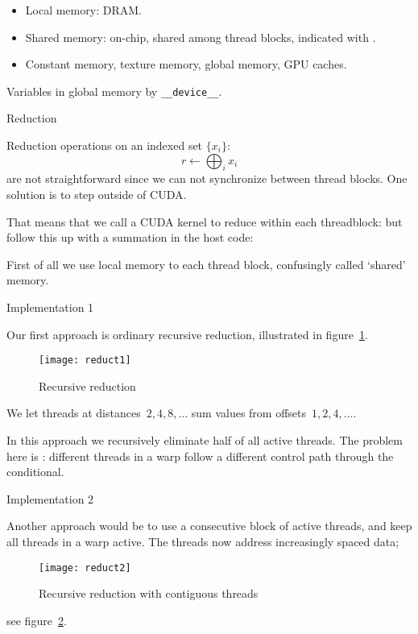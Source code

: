 
\begin{itemize}
\item Local memory: DRAM.
\item Shared memory: on-chip, shared among thread blocks,
  indicated with .
\item Constant memory, texture memory, global memory, GPU caches.
\end{itemize}

Variables in global memory by \lstinline{__device__}.

 {Reduction}
\label{sec:cu-reduce}

Reduction operations on an indexed set $\{x_i\}$:
\[ r\leftarrow \bigoplus_i x_i \]
are not straightforward since we can not
synchronize between thread blocks.
One solution is to step outside of CUDA.

That means that we call a \ac{CUDA} kernel to reduce
within each threadblock:
but follow this up with a summation in the host code:

First of all we use local memory to each thread block,
confusingly called `shared' memory.

 {Implementation 1}

Our first approach is ordinary recursive reduction,
illustrated in figure~\ref{fig:cureduct1}.
\begin{figure}[ht]
  \texttt{[image: reduct1]}
  \caption{Recursive reduction}
  \label{fig:cureduct1}
\end{figure}
We let threads
at distances~$2,4,8,\ldots$ sum values
from offsets~$1,2,4,\ldots$.

In this approach we recursively eliminate half of all active threads.
The problem here is :
different threads in a warp follow a different control path
through the conditional.

 {Implementation 2}

Another approach would be to use a consecutive block of active threads,
and keep all threads in a warp active.
The threads now
address increasingly spaced data;
\begin{figure}[ht]
  \texttt{[image: reduct2]}
  \caption{Recursive reduction with contiguous threads}
  \label{fig:cureduct2}
\end{figure}
see figure~\ref{fig:cureduct2}.

